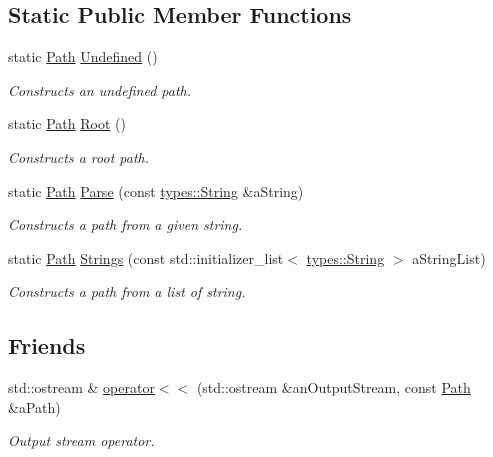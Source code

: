 \subsection*{Static Public Member Functions}
\begin{DoxyCompactItemize}
\item 
static \hyperlink{classlibrary_1_1core_1_1fs_1_1Path}{Path} \hyperlink{classlibrary_1_1core_1_1fs_1_1Path_a89cddd92be70121f2537726d69ca6499}{Undefined} ()
\begin{DoxyCompactList}\small\item\em Constructs an undefined path. \end{DoxyCompactList}\item 
static \hyperlink{classlibrary_1_1core_1_1fs_1_1Path}{Path} \hyperlink{classlibrary_1_1core_1_1fs_1_1Path_aa7276f3f578b7ebc40bb0fba7e9c2750}{Root} ()
\begin{DoxyCompactList}\small\item\em Constructs a root path. \end{DoxyCompactList}\item 
static \hyperlink{classlibrary_1_1core_1_1fs_1_1Path}{Path} \hyperlink{classlibrary_1_1core_1_1fs_1_1Path_aebf5bd3af83e0b7376616e146f3e55df}{Parse} (const \hyperlink{classlibrary_1_1core_1_1types_1_1String}{types\+::\+String} \&a\+String)
\begin{DoxyCompactList}\small\item\em Constructs a path from a given string. \end{DoxyCompactList}\item 
static \hyperlink{classlibrary_1_1core_1_1fs_1_1Path}{Path} \hyperlink{classlibrary_1_1core_1_1fs_1_1Path_a8b5672cb98f78457824137454065897c}{Strings} (const std\+::initializer\+\_\+list$<$ \hyperlink{classlibrary_1_1core_1_1types_1_1String}{types\+::\+String} $>$ a\+String\+List)
\begin{DoxyCompactList}\small\item\em Constructs a path from a list of string. \end{DoxyCompactList}\end{DoxyCompactItemize}
\subsection*{Friends}
\begin{DoxyCompactItemize}
\item 
std\+::ostream \& \hyperlink{classlibrary_1_1core_1_1fs_1_1Path_a87813ac3ede0b43b50ae6b9fdf0a2815}{operator$<$$<$} (std\+::ostream \&an\+Output\+Stream, const \hyperlink{classlibrary_1_1core_1_1fs_1_1Path}{Path} \&a\+Path)
\begin{DoxyCompactList}\small\item\em Output stream operator. \end{DoxyCompactList}\end{DoxyCompactItemize}


